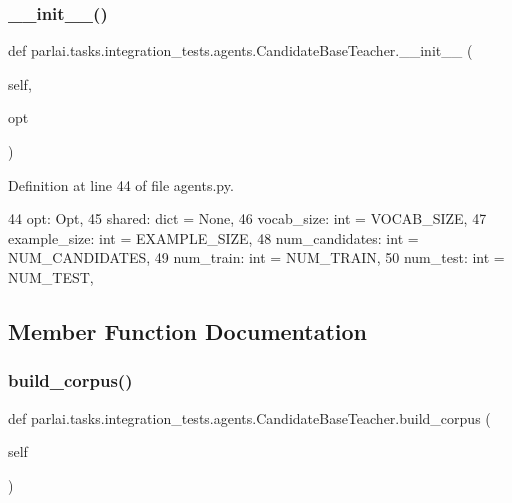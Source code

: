 \subsubsection{\texorpdfstring{\+\_\+\+\_\+init\+\_\+\+\_\+()}{\_\_init\_\_()}}
{\footnotesize\ttfamily def parlai.\+tasks.\+integration\+\_\+tests.\+agents.\+Candidate\+Base\+Teacher.\+\_\+\+\_\+init\+\_\+\+\_\+ (\begin{DoxyParamCaption}\item[{}]{self,  }\item[{}]{opt }\end{DoxyParamCaption})}



Definition at line 44 of file agents.\+py.


\begin{DoxyCode}
44         opt: Opt,
45         shared: dict = \textcolor{keywordtype}{None},
46         vocab\_size: int = VOCAB\_SIZE,
47         example\_size: int = EXAMPLE\_SIZE,
48         num\_candidates: int = NUM\_CANDIDATES,
49         num\_train: int = NUM\_TRAIN,
50         num\_test: int = NUM\_TEST,
\end{DoxyCode}


\subsection{Member Function Documentation}
\mbox{\label{classparlai_1_1tasks_1_1integration__tests_1_1agents_1_1CandidateBaseTeacher_acc36b2f9fb42b69b2e0da43f398fdb47}} 
\subsubsection{\texorpdfstring{build\+\_\+corpus()}{build\_corpus()}}
{\footnotesize\ttfamily def parlai.\+tasks.\+integration\+\_\+tests.\+agents.\+Candidate\+Base\+Teacher.\+build\+\_\+corpus (\begin{DoxyParamCaption}\item[{}]{self }\end{DoxyParamCaption})}

